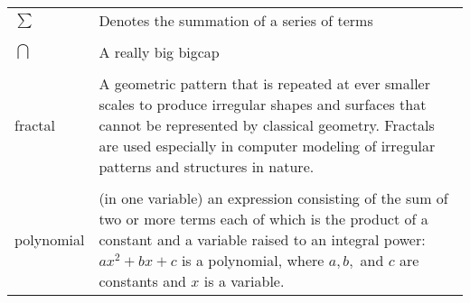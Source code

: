 \singlespacing
\begin{tabular}{l p{5in}} 
$\sum$ & Denotes the summation of a series of terms\\
\\%
$\bigcap$ & A really big bigcap\\
\\
fractal & A geometric pattern that is repeated at ever smaller
scales to produce irregular shapes and surfaces that cannot be represented by classical
geometry. Fractals are used especially in computer modeling of irregular patterns and structures in nature.\\
\\
polynomial & (in one variable) an expression consisting of the sum of two
or more terms each of which is the product of a constant and a
variable raised to an integral power: $ax^2 + bx + c$ is a
polynomial, where $a, b,$ and $c$ are constants and $x$ is a
variable.\\

\end{tabular}
\doublespacing

